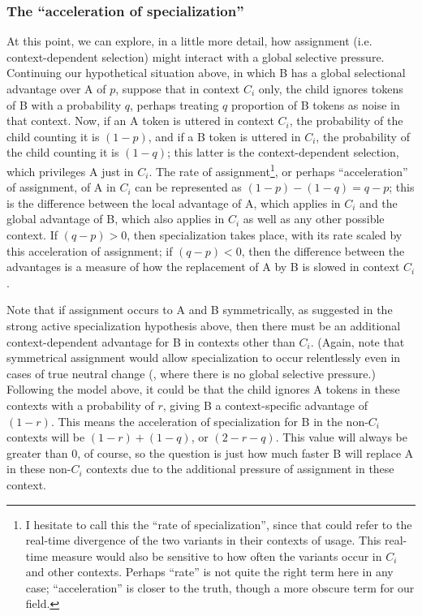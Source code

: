 \subsubsection{The ``acceleration of specialization''}

At this point, we can explore, in a little more detail, how assignment (i.e. context-dependent selection) might interact with a global selective pressure.
Continuing our hypothetical situation above, in which B has a global selectional advantage over A of $p$, suppose that in context $C_i$ only, the child ignores tokens of B with a probability $q$, perhaps treating $q$ proportion of B tokens as noise in that context.
Now, if an A token is uttered in context $C_i$, the probability of the child counting it is $(1-p)$, and if a B token is uttered in $C_i$, the probability of the child counting it is $(1-q)$; this latter is the context-dependent selection, which privileges A just in $C_i$.
The rate of assignment\footnote{I hesitate to call this the ``rate of specialization'', since that could refer to the real-time divergence of the two variants in their contexts of usage. This real-time measure would also be sensitive to how often the variants occur in $C_i$ and other contexts. Perhaps ``rate'' is not quite the right term here in any case; ``acceleration'' is closer to the truth, though a more obscure term for our field.}, or perhaps ``acceleration'' of assignment, of A in $C_i$ can be represented as $(1-p) - (1-q) = q - p$; this is the difference between the local advantage of A, which applies in $C_i$ and the global advantage of B, which also applies in $C_i$ as well as any other possible context.
If $(q-p) > 0$, then specialization takes place, with its rate scaled by this acceleration of assignment; if $(q-p) < 0$, then the difference between the advantages is a measure of how the replacement of A by B is slowed in context $C_i$.

Note that if assignment occurs to A and B symmetrically, as suggested in the strong active specialization hypothesis above, then there must be an additional context-dependent advantage for B in contexts other than $C_i$.
(Again, note that symmetrical assignment would allow specialization to occur relentlessly even in cases of true neutral change (\citealt{kauhanen2016}, where there is no global selective pressure.)
Following the model above, it could be that the child ignores A tokens in these contexts with a probability of $r$, giving B a context-specific advantage of $(1-r)$.
This means the acceleration of specialization for B in the non-$C_i$ contexts will be $(1-r) + (1-q)$, or $(2-r-q)$.
This value will always be greater than 0, of course, so the question is just how much faster B will replace A in these non-$C_i$ contexts due to the additional pressure of assignment in these context.


